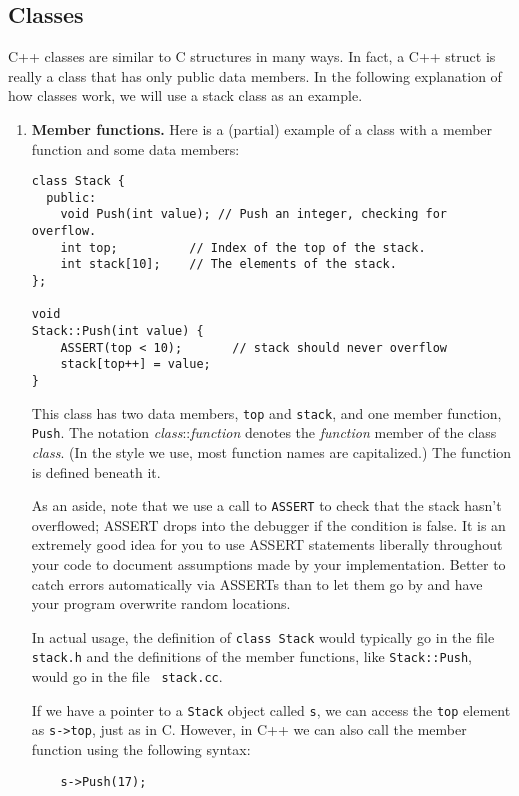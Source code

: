 \subsection{Classes}

C++ classes are similar to C structures in many ways.  In fact, a C++
struct is really a class that has only public data members.
In the following explanation of how classes work, we will use a stack
class as an example.

\begin{enumerate}
\item {\bf Member functions.}   Here is a (partial) example of a class
with a member function and some data members:
\begin{verbatim}
class Stack {
  public:
    void Push(int value); // Push an integer, checking for overflow.
    int top;          // Index of the top of the stack.
    int stack[10];    // The elements of the stack.
};

void
Stack::Push(int value) {
    ASSERT(top < 10);		// stack should never overflow
    stack[top++] = value;
}
\end{verbatim}

This class has two data members, {\tt top} and {\tt stack}, and one
member function, {\tt Push}.  
The notation {\em class}::{\em function} denotes the
{\em function} member of the class {\em class}.  (In the style we use,
most function names are capitalized.)  The function is defined beneath
it.  

As an aside, note that we use a call to {\tt ASSERT} to check that 
the stack hasn't overflowed; ASSERT drops into the debugger if the condition
is false.  It is an extremely good idea for you to use ASSERT
statements liberally throughout your code to document assumptions
made by your implementation.  Better to catch errors automatically
via ASSERTs than to let them go by and have your program overwrite 
random locations.  

In actual usage, the definition of {\tt class Stack} would typically
go in the file {\tt stack.h} and the definitions of the member
functions, like {\tt Stack::Push}, would go in the file {\tt
stack.cc}.

If we have a pointer to a {\tt Stack} object called {\tt s}, we can
access the {\tt top} element as {\tt s->top}, just as in C.  However,
in C++ we can also call the member function using the following syntax:

\begin{verbatim}
    s->Push(17);
\end{verbatim}


\end{enumerate}
